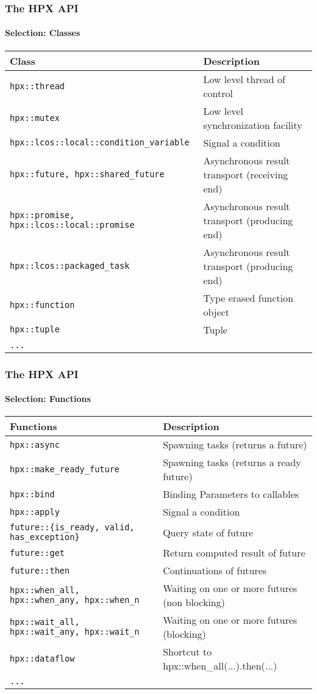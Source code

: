 \begin{frame}
\frametitle{The HPX API}
\framesubtitle{Selection: Classes}
\begin{center}
\begin{tabular}{ |l|l| } 
 \hline
 Class & Description \\
 \hline
 \texttt{hpx::thread} & Low level thread of control \\
 \texttt{hpx::mutex} & Low level synchronization facility \\
 \texttt{hpx::lcos::local::condition\_variable} & Signal a condition \\
 \texttt{hpx::future, hpx::shared\_future} & Asynchronous result transport (receiving end) \\
 \texttt{hpx::promise, hpx::lcos::local::promise} & Asynchronous result transport (producing end) \\
 \texttt{hpx::lcos::packaged\_task} & Asynchronous result transport (producing end) \\
 \texttt{hpx::function} & Type erased function object \\
 \texttt{hpx::tuple} & Tuple \\
 \texttt{...} &  \\
 \hline
\end{tabular}
\end{center}
\end{frame}

\begin{frame}
\frametitle{The HPX API}
\framesubtitle{Selection: Functions}
\begin{center}
\begin{tabular}{ |l|l| }
 \hline
 Functions & Description \\
 \hline
 \texttt{hpx::async} & Spawning tasks (returns a future) \\
 \texttt{hpx::make\_ready\_future} & Spawning tasks (returns a ready future) \\
 \texttt{hpx::bind} & Binding Parameters to callables \\
 \texttt{hpx::apply} & Signal a condition \\
 \texttt{future::\{is\_ready, valid, has\_exception\}} & Query state of future \\
 \texttt{future::get} & Return computed result of future \\
 \texttt{future::then} & Continuations of futures \\
 \texttt{hpx::when\_all, hpx::when\_any, hpx::when\_n} & Waiting on one or more futures (non blocking) \\
 \texttt{hpx::wait\_all, hpx::wait\_any, hpx::wait\_n} & Waiting on one or more futures (blocking) \\
 \texttt{hpx::dataflow} & Shortcut to hpx::when\_all(...).then(...) \\
 \texttt{...} &  \\
 \hline
\end{tabular}
\end{center}
\end{frame}


